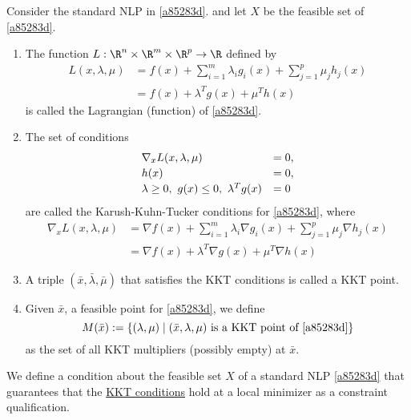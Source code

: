 \label{b38093d}

Consider the standard NLP in \ref{a85283d}. and let $X$ be the feasible set of
\ref{a85283d}.

\begin{enumerate}
  \item The function $L:\R^n\times\R^m\times\R^p\to\R$ defined by
        \begin{align*}
          L(x,\lambda,\mu)
           & =f(x)+\sum_{i=1}^m\lambda_ig_i(x)+\sum_{j=1}^p\mu_jh_j(x) \\
           & =f(x)+\lambda^Tg(x)+\mu^Th(x)
        \end{align*}
        is called the Lagrangian (function) of \ref{a85283d}.
  \item The set of conditions
        $$
          \begin{array}{l l}
            \nabla_xL(x,\lambda,\mu)                 & =0, \\[0.2em]
            h(x)                                     & =0, \\[0.2em]
            \lambda\geq0,\ g(x)\leq0,\ \lambda^Tg(x) & =0
          \end{array}
        $$
        are called the Karush-Kuhn-Tucker conditions for \ref{a85283d}, where
        \begin{align*}
          \nabla_xL(x,\lambda,\mu)
           & = \nabla f(x)+\sum_{i=1}^m\lambda_i\nabla g_i(x)+\sum_{j=1}^p\mu_j\nabla h_j(x) \\
           & = \nabla f(x)+\lambda^T\nabla g(x)+\mu^T\nabla h(x)
        \end{align*}
  \item A triple $(\bar x,\bar\lambda,\bar\mu)$ that satisfies the KKT conditions is
        called a KKT point.
  \item Given $\bar x$, a feasible point for \ref{a85283d}, we define
        $$
          M(\bar x):=\{(\lambda,\mu)\mid(\bar x,\lambda,\mu)\text{ is a KKT point of \ref{a85283d}}\}
        $$
        as the set of all KKT multipliers (possibly empty) at $\bar x$.
\end{enumerate}

\label{d533941}

We define a condition about the feasible set $X$ of a standard NLP
\ref{a85283d} that guarantees that the \href{b38093d}{KKT conditions} hold at a
local minimizer as a constraint qualification.

